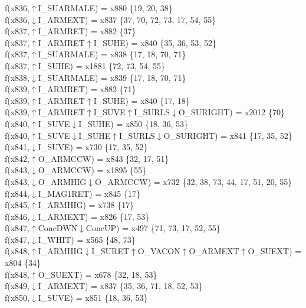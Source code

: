 f(x836,$\uparrow$I\_SUARMALE) = x880 \{19, 20, 38\} \\  
f(x836,$\downarrow$I\_ARMEXT) = x837 \{37, 70, 72, 73, 17, 54, 55\} \\  
f(x837,$\uparrow$I\_ARMRET) = x882 \{37\} \\  
f(x837,$\uparrow$I\_ARMRET$\uparrow$I\_SUHE) = x840 \{35, 36, 53, 52\} \\  
f(x837,$\uparrow$I\_SUARMALE) = x838 \{17, 18, 70, 71\} \\  
f(x837,$\uparrow$I\_SUHE) = x1881 \{72, 73, 54, 55\} \\  
f(x838,$\downarrow$I\_SUARMALE) = x839 \{17, 18, 70, 71\} \\  
f(x839,$\uparrow$I\_ARMRET) = x882 \{71\} \\  
f(x839,$\uparrow$I\_ARMRET$\uparrow$I\_SUHE) = x840 \{17, 18\} \\  
f(x839,$\uparrow$I\_ARMRET$\uparrow$I\_SUVE$\uparrow$I\_SURLS$\downarrow$O\_SURIGHT) = x2012 \{70\} \\  
f(x840,$\uparrow$I\_SUVE$\downarrow$I\_SUHE) = x850 \{18, 36, 53\} \\  
f(x840,$\uparrow$I\_SUVE$\downarrow$I\_SUHE$\uparrow$I\_SURLS$\downarrow$O\_SURIGHT) = x841 \{17, 35, 52\} \\  
f(x841,$\downarrow$I\_SUVE) = x730 \{17, 35, 52\} \\  
f(x842,$\uparrow$O\_ARMCCW) = x843 \{32, 17, 51\} \\  
f(x843,$\downarrow$O\_ARMCCW) = x1895 \{55\} \\  
f(x843,$\downarrow$O\_ARMHIG$\downarrow$O\_ARMCCW) = x732 \{32, 38, 73, 44, 17, 51, 20, 55\} \\  
f(x844,$\downarrow$I\_MAG1RET) = x845 \{17\} \\  
f(x845,$\uparrow$I\_ARMHIG) = x738 \{17\} \\  
f(x846,$\downarrow$I\_ARMEXT) = x826 \{17, 53\} \\  
f(x847,$\uparrow$ConcDWN$\downarrow$ConcUP) = x497 \{71, 73, 17, 52, 55\} \\  
f(x847,$\downarrow$I\_WHIT) = x565 \{48, 73\} \\  
f(x848,$\uparrow$I\_ARMHIG$\downarrow$I\_SURET$\uparrow$O\_VACON$\uparrow$O\_ARMEXT$\uparrow$O\_SUEXT) = x804 \{34\} \\  
f(x848,$\uparrow$O\_SUEXT) = x678 \{32, 18, 53\} \\  
f(x849,$\downarrow$I\_ARMEXT) = x837 \{35, 36, 71, 18, 52, 53\} \\  
f(x850,$\downarrow$I\_SUVE) = x851 \{18, 36, 53\} \\  
